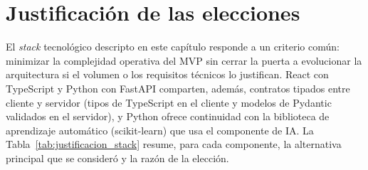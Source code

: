 \section{Justificación de las elecciones}
\label{sec:justificacion}

El \textit{stack} tecnológico descripto en este capítulo responde a un criterio común: minimizar la complejidad operativa del MVP sin cerrar la puerta a evolucionar la arquitectura si el volumen o los requisitos técnicos lo justifican. React con TypeScript y Python con FastAPI comparten, además, contratos tipados entre cliente y servidor (tipos de TypeScript en el cliente y modelos de Pydantic validados en el servidor), y Python ofrece continuidad con la biblioteca de aprendizaje automático (scikit-learn) que usa el componente de IA. La Tabla~\ref{tab:justificacion_stack} resume, para cada componente, la alternativa principal que se consideró y la razón de la elección.


